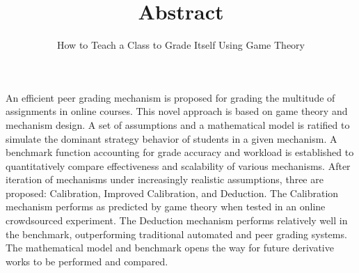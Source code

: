 \documentclass[12pt, Arial]{article}
\title{Abstract}
\author{How to Teach a Class to Grade Itself Using Game Theory}
\date{}
\begin{document}
\maketitle
An efficient peer grading mechanism is proposed for grading the multitude of assignments in online courses. This novel approach is based on game theory and mechanism design. A set of assumptions and a mathematical model is ratified to simulate the dominant strategy behavior of students in a given mechanism. A benchmark function accounting for grade accuracy and workload is established to quantitatively compare effectiveness and scalability of various mechanisms. After iteration of mechanisms under increasingly realistic assumptions, three are proposed: Calibration, Improved Calibration, and Deduction. The Calibration mechanism performs as predicted by game theory when tested in an online crowdsourced experiment. The Deduction mechanism performs relatively well in the benchmark, outperforming traditional automated and peer grading systems. The mathematical model and benchmark opens the way for future derivative works to be performed and compared.
\end{document}
